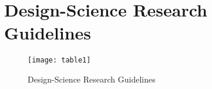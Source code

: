 \chapter{Design-Science Research Guidelines}
\begin{figure}[h!]
\label{table1}
\centering
	\texttt{[image: table1]}
\caption{Design-Science Research Guidelines}
\end{figure}
